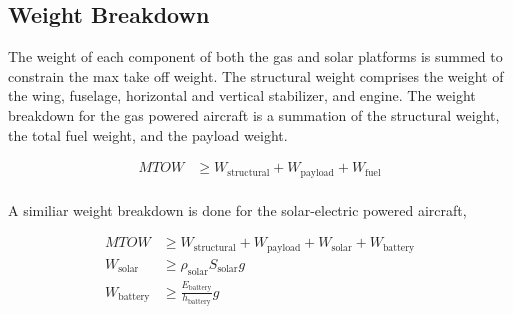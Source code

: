 \documentclass[]{aiaa-tc}%
\begin{document}
\subsection{Weight Breakdown}

The weight of each component of both the gas and solar platforms is summed to constrain the max take off weight.  
The structural weight comprises the weight of the wing, fuselage, horizontal and vertical stabilizer, and engine. 
The weight breakdown for the gas powered aircraft is a summation of the structural weight, the total fuel weight, and the payload weight. 

\begin{align}
    \label{e:weightmtow}
    MTOW &\geq W_{\text{structural}}  + W_{\text{payload}} + W_{\text{fuel}} \\
\end{align}

A similiar weight breakdown is done for the solar-electric powered aircraft, 

\begin{align}
    \label{e:weightsmtow}
    MTOW &\geq W_{\text{structural}} + W_{\text{payload}} + W_{\text{solar}} + W_{\text{battery}} \\
    W_{\text{solar}} &\geq \rho_{\text{solar}} S_{\text{solar}} g \\
    W_{\text{battery}} &\geq \frac{E_{\text{battery}}}{h_{\text{battery}}} g
\end{align}
\end{document}
